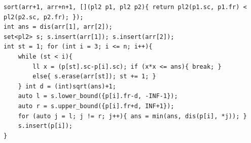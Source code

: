 \begin{verbatim}
sort(arr+1, arr+n+1, [](pl2 p1, pl2 p2){ return pl2(p1.sc, p1.fr) < pl2(p2.sc, p2.fr); });
int ans = dis(arr[1], arr[2]);
set<pl2> s; s.insert(arr[1]); s.insert(arr[2]);
int st = 1; for (int i = 3; i <= n; i++){
	while (st < i){
		ll x = (p[st].sc-p[i].sc); if (x*x <= ans){ break; }
		else{ s.erase(arr[st]); st += 1; }
	} int d = (int)sqrt(ans)+1;
	auto l = s.lower_bound({p[i].fr-d, -INF-1});
	auto r = s.upper_bound({p[i].fr+d, INF+1});
	for (auto j = l; j != r; j++){ ans = min(ans, dis(p[i], *j)); }
	s.insert(p[i]);
}
\end{verbatim}